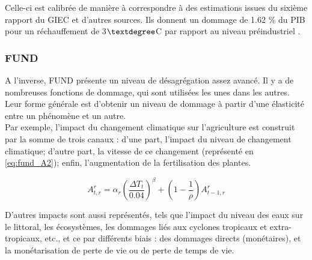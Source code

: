 Celle-ci est calibrée de manière à correspondre à des estimations issues du sixième rapport du GIEC et d'autres sources. Ils donnent un dommage de 1.62 \% du PIB pour un réchauffement de 3$\textdegree$C par rapport au niveau préindustriel \cite{barrage_policies_2023, nordhaus_dice_2013}. 

\subsubsection{FUND} 

A l'inverse, FUND présente un niveau de désagrégation assez avancé. Il y a de nombreuses fonctions de dommage, qui sont utilisées les unes dans les autres. Leur forme générale est d'obtenir un niveau de dommage à partir d'une élasticité entre un phénomène et un autre. \\

Par exemple, l'impact du changement climatique sur l'agriculture est construit par la somme de trois canaux : d'une part, l'impact du niveau de changement climatique; d'autre part, la vitesse de ce changement (représenté en \ref{eq:fund_A2}); enfin, l'augmentation de la fertilisation des plantes. 

\begin{equation}
    A_{t,r}^{r}=\alpha_{r}\left(\frac{\Delta T_{t}}{0.04}\right)^{\beta}+\left(1-\frac{1}{\rho}\right)A_{t-1,r}^{r}
    \label{eq:fund_A2}
\end{equation}

D'autres impacts sont aussi représentés, tels que l'impact du niveau des eaux sur le littoral, les écosystèmes, les dommages liés aux cyclones tropicaux et extra-tropicaux, etc., et ce par différents biais : des dommages directs (monétaires), et la monétarisation de perte de vie ou de perte de temps de vie. 


